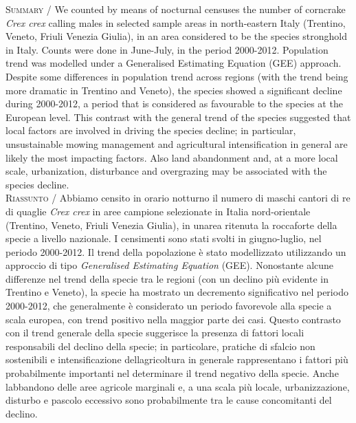 {\small

\noindent \textsc{\color{MUSEBLUE} Summary} / We counted by means of nocturnal censuses the number of corncrake
\textit{Crex crex} calling males in selected sample areas in
north-eastern Italy (Trentino, Veneto, Friuli Venezia Giulia), in an
area considered to be the species{\textquotesingle} stronghold in
Italy. Counts were done in June-July, in the period 2000-2012.
Population trend was modelled under a Generalised Estimating Equation
(GEE) approach. Despite some differences in population trend across
regions (with the trend being more dramatic in Trentino and Veneto),
the species showed a significant decline during 2000-2012, a period
that is considered as favourable to the species at the European level.
This contrast with the general trend of the species suggested that
local factors are involved in driving the species decline; in
particular, unsustainable mowing management and agricultural
intensification in general are likely the most impacting factors. Also
land abandonment and, at a more local scale, urbanization, disturbance
and overgrazing may be associated with the species decline. \\
\noindent \textsc{\color{MUSEBLUE} Riassunto} / Abbiamo censito in orario notturno il numero di maschi cantori di re di
quaglie \textit{Crex crex} in aree campione selezionate in Italia
nord-orientale (Trentino, Veneto, Friuli Venezia Giulia), in
un{\textquotesingle}area ritenuta la roccaforte della specie a livello
nazionale. I censimenti sono stati svolti in giugno-luglio, nel periodo
2000-2012. Il trend della popolazione \`e stato modellizzato
utilizzando un approccio di tipo \textit{Generalised Estimating
Equation }(GEE). Nonostante alcune differenze nel trend della specie
tra le regioni (con un declino pi\`u evidente in Trentino e Veneto), la
specie ha mostrato un decremento significativo nel periodo 2000-2012,
che generalmente \`e considerato un periodo favorevole alla specie a
scala europea, con trend positivo nella maggior parte dei casi. Questo
contrasto con il trend generale della specie suggerisce la presenza di
fattori locali responsabili del declino della specie; in particolare,
pratiche di sfalcio non sostenibili e intensificazione
dell{\textquotesingle}agricoltura in generale rappresentano i fattori
pi\`u probabilmente importanti nel determinare il trend negativo della
specie. Anche l{\textquotesingle}abbandono delle aree agricole
marginali e, a una scala pi\`u locale, urbanizzazione, disturbo e
pascolo eccessivo sono probabilmente tra le cause concomitanti del
declino.
}



